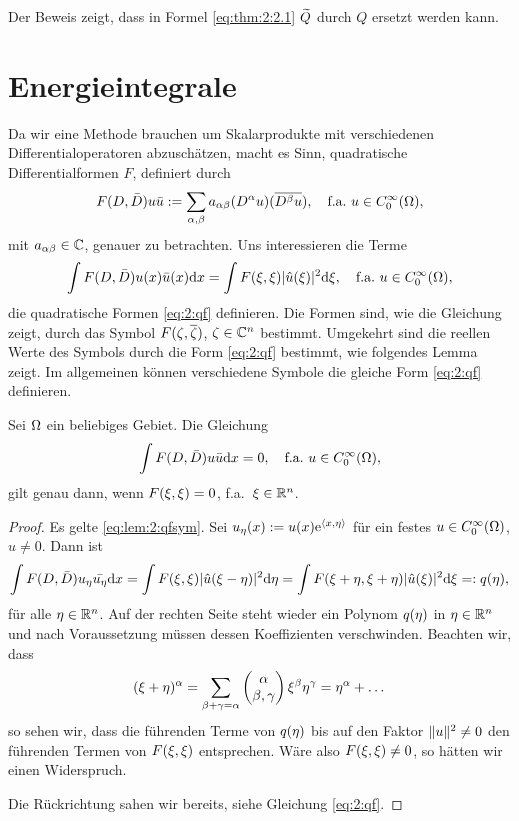 Der Beweis zeigt,
dass in Formel \eqref{eq:thm:2:2.1} $\widetilde{Q}$ durch $Q$ ersetzt werden kann.

\section{Energieintegrale}

Da wir eine Methode brauchen um Skalarprodukte
mit verschiedenen Differentialoperatoren abzuschätzen,
macht es Sinn, quadratische Differentialformen $F$, definiert durch
\begin{equation}
F(D,\bar{D})u\bar{u}:=\sum_{\alpha,\beta}a_{\alpha\beta}(D^\alpha u)(\overline{D^\beta u}),
\quad\text{f.a.}~u\in C^\infty_0(\Omega),
\end{equation}
mit $a_{\alpha\beta}\in\mathbb C$, genauer zu betrachten.
Uns interessieren die Terme
\begin{equation}\label{eq:2:qf}
\int F(D,\bar{D})u(x)\bar{u}(x)\mathrm{d} x=\int F(\xi,\xi)\lvert\hat{u}(\xi)\rvert^2\mathrm{d} \xi,
\quad\text{f.a.}~u\in C^\infty_0(\Omega),
\end{equation}
die quadratische Formen \eqref{eq:2:qf} definieren.
Die Formen sind, wie die Gleichung zeigt,
durch das Symbol $F(\zeta,\overline{\zeta})$, $\zeta\in\mathbb C^n$ bestimmt.
Umgekehrt sind die reellen Werte des Symbols
durch die Form \eqref{eq:2:qf} bestimmt,
wie folgendes Lemma zeigt.
Im allgemeinen können verschiedene Symbole
die gleiche Form \eqref{eq:2:qf} definieren.

\begin{lem}\label{lem:2:qfsym}
Sei $\Omega$ ein beliebiges Gebiet.
Die Gleichung
\begin{equation}\label{eq:lem:2:qfsym}
\int F(D,\bar{D})u\bar{u}\mathrm{d} x=0,
\quad\text{f.a.}~u\in C^\infty_0(\Omega),
\end{equation}
gilt genau dann, wenn $F(\xi,\xi)=0$, f.a.~$\xi\in\mathbb R^n$.
\end{lem}
\begin{proof}
Es gelte \eqref{eq:lem:2:qfsym}.
Sei $u_\eta(x):=u(x)\mathrm e^{\langle x,\eta\rangle}$ für ein festes $u\in C^\infty_0(\Omega)$, $u\neq0$.
Dann ist
\begin{equation}
\int F(D,\bar{D})u_\eta\bar{u_\eta}\mathrm{d} x=\int F(\xi,\xi)\lvert\hat{u}(\xi-\eta)\rvert^2\mathrm{d} \eta=\int F(\xi+\eta,\xi+\eta)\lvert\hat{u}(\xi)\rvert^2\mathrm{d}\xi=:q(\eta),
\end{equation}
für alle $\eta\in\mathbb R^n$.
Auf der rechten Seite steht wieder ein Polynom $q(\eta)$ in $\eta\in\mathbb R^n$
und nach Voraussetzung müssen dessen Koeffizienten verschwinden.
Beachten wir, dass
\begin{equation}
(\xi+\eta)^\alpha=\sum_{\beta+\gamma=\alpha}\begin{pmatrix}\alpha\\\beta,\gamma\end{pmatrix}\xi^\beta\eta^\gamma=\eta^\alpha+\dots
\end{equation}
so sehen wir, dass die führenden Terme von $q(\eta)$
bis auf den Faktor $\lVert u\rVert^2\neq0$ den führenden Termen von $F(\xi,\xi)$ entsprechen.
Wäre also $F(\xi,\xi)\neq0$, so hätten wir einen Widerspruch.

Die Rückrichtung sahen wir bereits, siehe Gleichung \eqref{eq:2:qf}.
\end{proof}

